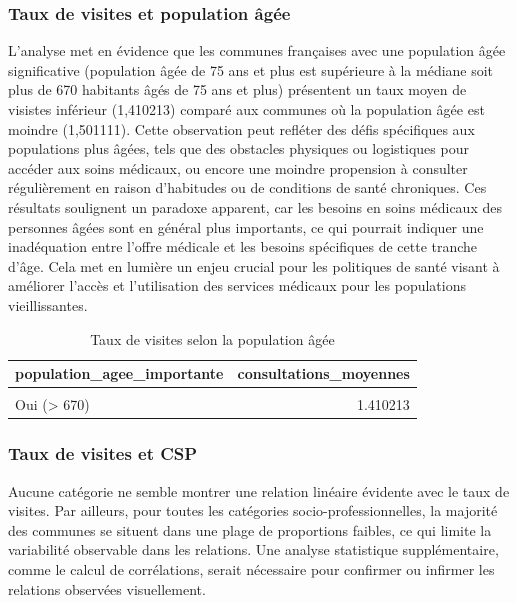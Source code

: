 \documentclass[
]{article}
\begin{document}
\hypertarget{taux-de-visites-et-population-uxe2guxe9e}{%
\subsubsection{Taux de visites et population
âgée}\label{taux-de-visites-et-population-uxe2guxe9e}}

L'analyse met en évidence que les communes françaises avec une
population âgée significative (population âgée de 75 ans et plus est
supérieure à la médiane soit plus de 670 habitants âgés de 75 ans et
plus) présentent un taux moyen de visistes inférieur (1,410213) comparé
aux communes où la population âgée est moindre (1,501111). Cette
observation peut refléter des défis spécifiques aux populations plus
âgées, tels que des obstacles physiques ou logistiques pour accéder aux
soins médicaux, ou encore une moindre propension à consulter
régulièrement en raison d'habitudes ou de conditions de santé
chroniques. Ces résultats soulignent un paradoxe apparent, car les
besoins en soins médicaux des personnes âgées sont en général plus
importants, ce qui pourrait indiquer une inadéquation entre l'offre
médicale et les besoins spécifiques de cette tranche d'âge. Cela met en
lumière un enjeu crucial pour les politiques de santé visant à améliorer
l'accès et l'utilisation des services médicaux pour les populations
vieillissantes.

\begin{table}[H]
\centering
\caption{\label{tab:unnamed-chunk-22}Taux de visites selon la population âgée}
\centering
\begin{tabular}[t]{lr}
\toprule
population\_agee\_importante & consultations\_moyennes\\
\midrule
\cellcolor{gray!10}{Non (<= 670)} & \cellcolor{gray!10}{1.501111}\\
Oui (> 670) & 1.410213\\
\bottomrule
\end{tabular}
\end{table}

\hypertarget{taux-de-visites-et-csp}{%
\subsubsection{Taux de visites et CSP}\label{taux-de-visites-et-csp}}

Aucune catégorie ne semble montrer une relation linéaire évidente avec
le taux de visites. Par ailleurs, pour toutes les catégories
socio-professionnelles, la majorité des communes se situent dans une
plage de proportions faibles, ce qui limite la variabilité observable
dans les relations. Une analyse statistique supplémentaire, comme le
calcul de corrélations, serait nécessaire pour confirmer ou infirmer les
relations observées visuellement.
\end{document}
